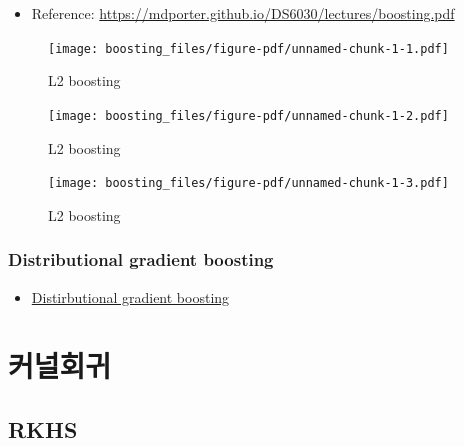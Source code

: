 \documentclass[
  letterpaper,
  DIV=11,
  numbers=noendperiod]{scrreprt}
\providecommand{\tightlist}{%
  \setlength{\itemsep}{0pt}\setlength{\parskip}{0pt}}\usepackage{longtable,booktabs,array}
\theoremstyle{definition}
\theoremstyle{plain}
\theoremstyle{definition}
\theoremstyle{definition}
\theoremstyle{remark}
\begin{document}
\begin{itemize}
\tightlist
\item
  Reference:
  \url{https://mdporter.github.io/DS6030/lectures/boosting.pdf}
\end{itemize}

\begin{figure}[H]

{\centering \texttt{[image: boosting\_files/figure-pdf/unnamed-chunk-1-1.pdf]}

}

\caption{L2 boosting}

\end{figure}%

\begin{figure}[H]

{\centering \texttt{[image: boosting\_files/figure-pdf/unnamed-chunk-1-2.pdf]}

}

\caption{L2 boosting}

\end{figure}%

\begin{figure}[H]

{\centering \texttt{[image: boosting\_files/figure-pdf/unnamed-chunk-1-3.pdf]}

}

\caption{L2 boosting}

\end{figure}%

\subsection{Distributional gradient
boosting}\label{distributional-gradient-boosting}

\begin{itemize}
\tightlist
\item
  \href{https://ar5iv.labs.arxiv.org/html/2204.00778}{Distirbutional
  gradient boosting}
\end{itemize}

\chapter{커널회귀}\label{uxcee4uxb110uxd68cuxadc0}

\section{RKHS}\label{rkhs}
\end{document}
